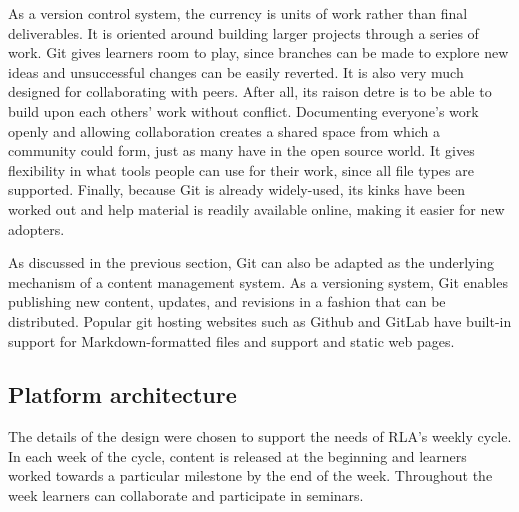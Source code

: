 \documentclass[12pt,twoside,vi]{mitthesis}
\begin{document}
As a version control system, the currency is units of work rather than final deliverables. It is oriented around building larger projects through a series of work. Git gives learners room to play, since branches can be made to explore new ideas and unsuccessful changes can be easily reverted. It is also very much designed for collaborating with peers. After all, its raison detre is to be able to build upon each others' work without conflict. Documenting everyone's work openly and allowing collaboration creates a shared space from which a community could form, just as many have in the open source world. It gives flexibility in what tools people can use for their work, since all file types are supported. Finally, because Git is already widely-used, its kinks have been worked out and help material is readily available online, making it easier for new adopters.

As discussed in the previous section, Git can also be adapted as the underlying mechanism of a content management system. As a versioning system, Git enables publishing new content, updates, and revisions in a fashion that can be distributed. Popular git hosting websites such as Github and GitLab have built-in support for Markdown-formatted files and support and static web pages.

\subsection{Platform architecture}

The details of the design were chosen to support the needs of RLA's weekly cycle. In each week of the cycle, content is released at the beginning and learners worked towards a particular milestone by the end of the week. Throughout the week learners can collaborate and participate in seminars.
\end{document}
